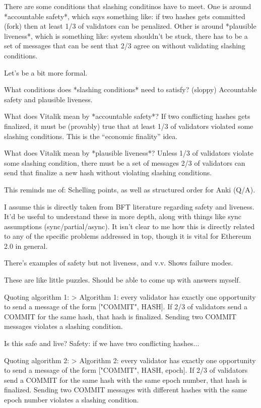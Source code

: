 \documentclass[12pt]{report}
\begin{document}
There are some conditions that slashing conditinos have to meet. One is around
*accountable safety*, which says something like: if two hashes gets committed (fork) then
at least 1/3 of validators can be penalized. Other is around *plausible liveness*, which
is something like: system shouldn't be stuck, there has to be a set of messages
that can be sent that 2/3 agree on without validating slashing conditions.

Let's be a bit more formal.

What conditions does *slashing conditions* need to satisfy? (sloppy)
Accountable safety and plausible liveness.

What does Vitalik mean by *accountable safety*?
If two conflicting hashes gets finalized, it must be (provably) true that at
least 1/3 of validators violated some slashing conditions. This is the
``economic finality'' idea.

What does Vitalik mean by *plausible liveness*?
Unless 1/3 of validators violate some slashing condition, there must be a set of
messages 2/3 of validators can send that finalize a new hash without violating
slashing conditions.

This reminds me of: Schelling points, as well as structured order for Anki (Q/A).

I assume this is directly taken from BFT literature regarding safety and
liveness. It'd be useful to understand these in more depth, along with things
like sync assumptions (sync/partial/async). It isn't clear to me how this is
directly related to any of the specific problems addressed in top, though it is
vital for Ethereum 2.0 in general.

There's examples of safety but not liveness, and v.v. Shows failure modes.

These are like little puzzles. Should be able to come up with answers myself.

Quoting algorithm 1:
> Algorithm 1: every validator has exactly one opportunity to send a message of
the form ["COMMIT", HASH]. If 2/3 of validators send a COMMIT for the same hash,
that hash is finalized. Sending two COMMIT messages violates a slashing
condition.

Is this safe and live? Safety: if we have two conflicting hashes...

Quoting algorithm 2:
> Algorithm 2: every validator has exactly one opportunity to send a message of
the form ["COMMIT", HASH, epoch]. If 2/3 of validators send a COMMIT for the
same hash with the same epoch number, that hash is finalized. Sending two COMMIT
messages with different hashes with the same epoch number violates a slashing
condition.
\end{document}
